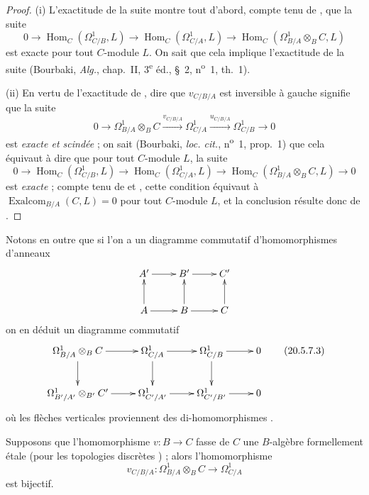 \begin{proof}
(i) L'exactitude de la suite  montre tout d'abord,
compte tenu de , que la suite
\[
  0\to\operatorname{Hom}_C(\Omega^1_{C/B},L)
  \to\operatorname{Hom}_C(\Omega^1_{C/A},L)
  \to\operatorname{Hom}_C(\Omega^1_{B/A}\otimes_B C,L)
\]
est exacte pour tout $C$-module $L$. On sait que cela implique l'exactitude
de la suite  (Bourbaki, \emph{Alg.}, chap.~II,
3\textsuperscript{e} éd., §~2, n\textsuperscript{o}~1, th.~1).

(ii) En vertu de l'exactitude de , dire que
$v_{C/B/A}$ est inversible à gauche signifie que la suite
\begin{equation}
\tag{20.5.7.2}
\label{0.20.5.7.2-fr}
  0\to\Omega^1_{B/A}\otimes_B C
  \xrightarrow{v_{C/B/A}}\Omega^1_{C/A}
  \xrightarrow{u_{C/B/A}}\Omega^1_{C/B}\to0
\end{equation}
est \emph{exacte et scindée} ; on sait (Bourbaki, \emph{loc. cit.},
n\textsuperscript{o}~1, prop.~1) que cela équivaut à dire que pour tout
$C$-module $L$, la suite
\[
  0\to\operatorname{Hom}_C(\Omega^1_{C/B},L)
  \to\operatorname{Hom}_C(\Omega^1_{C/A},L)
  \to\operatorname{Hom}_C(\Omega^1_{B/A}\otimes_B C,L)\to0
\]
est \emph{exacte} ; compte tenu de  et
, cette condition équivaut à
$\operatorname{Exalcom}_{B/A}(C,L)=0$ pour tout $C$-module $L$, et la conclusion résulte donc de
.
\end{proof}

Notons en outre que si l'on a un diagramme commutatif d'homomorphismes
d'anneaux
\[
\xymatrix{
  A' \ar[r] & B' \ar[r] & C' \\
  A \ar[u] \ar[r] & B \ar[u] \ar[r] & C \ar[u]
}
\]
on en déduit un diagramme commutatif
\[
\xymatrix{
  \Omega^1_{B/A}\otimes_B C \ar[r] \ar[d] &
  \Omega^1_{C/A} \ar[r] \ar[d] &
  \Omega^1_{C/B} \ar[r] \ar[d] & 0 \\
  \Omega^1_{B'/A'}\otimes_{B'} C' \ar[r] &
  \Omega^1_{C'/A'} \ar[r] &
  \Omega^1_{C'/B'} \ar[r] & 0
}
\tag{20.5.7.3}
\label{0.20.5.7.3-fr}
\]
où les flèches verticales proviennent des di-homomorphismes
.

\begin{corollary}[20.5.8]
\label{0.20.5.8-fr}
Supposons que l'homomorphisme $v:B\to C$ fasse de $C$ une $B$-algèbre
formellement étale (pour les topologies discrètes
) ; alors l'homomorphisme 
\[
  v_{C/B/A}:\Omega^1_{B/A}\otimes_B C\to\Omega^1_{C/A}
\]
est bijectif.
\end{corollary}

